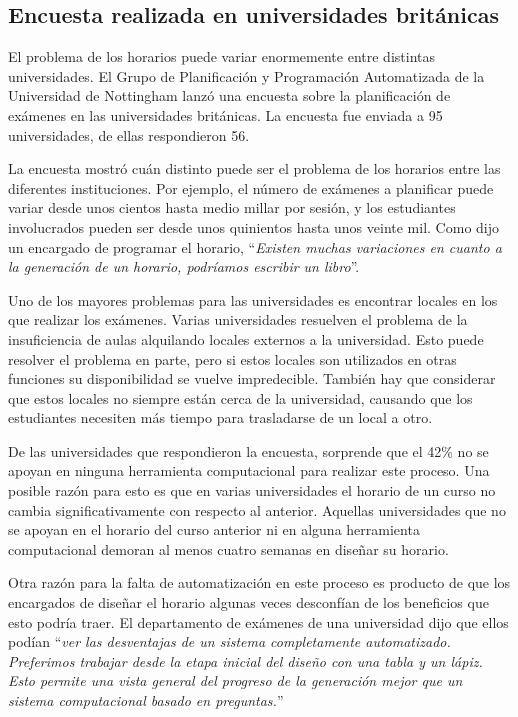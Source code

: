 \subsection{Encuesta realizada en universidades británicas}

El problema de los horarios puede variar enormemente entre distintas universidades. El Grupo de Planificación
y Programación Automatizada de la Universidad de Nottingham lanzó una encuesta \cite{survey of University of Nottingham} sobre la planificación de exámenes en las universidades británicas. La encuesta fue enviada a
95 universidades, de ellas respondieron 56.

La encuesta mostró cuán distinto puede ser el problema de los horarios entre las diferentes instituciones.
Por ejemplo, el número de exámenes a planificar puede variar desde unos cientos hasta medio millar por sesión,
y los estudiantes involucrados pueden ser desde unos quinientos hasta unos veinte mil. Como dijo un
encargado de programar el horario, ``\emph{Existen muchas variaciones en cuanto a la generación de un horario,
podr\'iamos escribir un libro}''.

Uno de los mayores problemas para las universidades es encontrar locales en los que realizar los exámenes.
Varias universidades resuelven el problema de la insuficiencia de aulas alquilando locales externos a la
universidad. Esto puede resolver el problema en parte, pero si estos locales son utilizados en otras funciones
su disponibilidad se vuelve impredecible. También hay que considerar que estos locales no siempre están cerca de
la universidad, causando que los estudiantes necesiten más tiempo para trasladarse de un local a otro.

De las universidades que respondieron la encuesta, sorprende que el 42\% no se apoyan en ninguna herramienta
computacional para realizar este proceso. Una posible razón para esto es que en varias universidades el
horario de un curso no cambia significativamente con respecto al anterior. Aquellas universidades que no
se apoyan en el horario del curso anterior ni en alguna herramienta computacional demoran al menos cuatro
semanas en diseñar su horario.

Otra razón para la falta de automatización en este proceso es producto de que los encargados de diseñar el horario
algunas veces desconf\'ian de los beneficios que esto podr\'ia traer. El departamento de exámenes de una universidad
dijo que ellos pod\'ian ``\emph{ver las desventajas de un sistema completamente automatizado. Preferimos trabajar
desde la etapa inicial del diseño con una tabla y un l\'apiz. Esto permite una vista general del progreso de la
generación mejor que un sistema computacional basado en preguntas.}''

